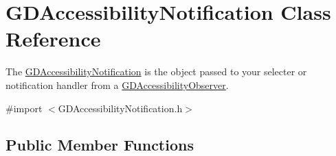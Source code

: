 \hypertarget{interface_g_d_accessibility_notification}{
\section{GDAccessibilityNotification Class Reference}
\label{interface_g_d_accessibility_notification}
}


The \hyperlink{interface_g_d_accessibility_notification}{GDAccessibilityNotification} is the object passed to your selecter or notification handler from a \hyperlink{interface_g_d_accessibility_observer}{GDAccessibilityObserver}.  


{\ttfamily \#import $<$GDAccessibilityNotification.h$>$}\subsection*{Public Member Functions}

